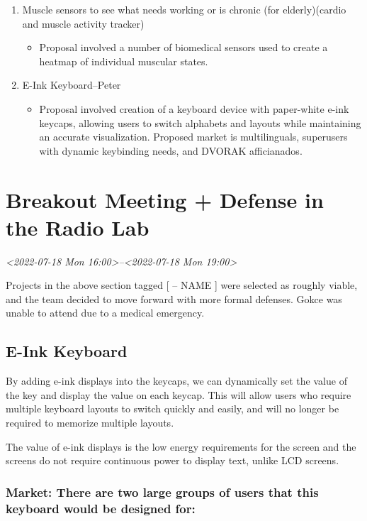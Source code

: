 \documentclass[11pt]{article}
\begin{document}
\begin{enumerate}
\begin{itemize}
\end{itemize}
\item Muscle sensors to see what needs working or is chronic (for elderly)(cardio and muscle activity tracker)
\begin{itemize}
\item Proposal involved a number of biomedical sensors used to create a heatmap of individual muscular states.
\end{itemize}
\item E-Ink Keyboard–Peter
\begin{itemize}
\item Proposal involved creation of a keyboard device with paper-white e-ink keycaps, allowing users to switch alphabets and layouts while maintaining an accurate visualization. Proposed market is multilinguals, superusers with dynamic keybinding needs, and DVORAK afficianados.
\end{itemize}
\end{enumerate}

\section{Breakout Meeting + Defense in the Radio Lab}
\label{sec:org2c82291}
\textit{<2022-07-18 Mon 16:00>--<2022-07-18 Mon 19:00>}

Projects in the above section tagged [ -- NAME ] were selected as roughly viable, and the team decided to move forward with more formal defenses. Gokce was unable to attend due to a medical emergency.

\subsection{E-Ink Keyboard}
\label{sec:org623a5c6}

By adding e-ink displays into the keycaps, we can dynamically set the value of the key and display the value on each keycap.  This will allow users who require multiple keyboard layouts to switch quickly and easily, and will no longer be required to memorize multiple layouts.

The value of e-ink displays is the low energy requirements for the screen and the screens do not require continuous power to display text, unlike LCD screens.

\subsubsection{Market: There are two large groups of users that this keyboard would be designed for:}
\label{sec:orgdfdf823}
\end{document}
